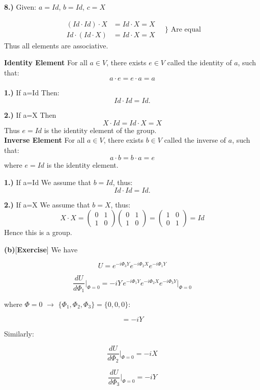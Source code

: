\documentclass{article}
\begin{document}
\textbf{8.)}
Given: \( a = Id \), \( b = Id \), \( c = X \)

\[
\begin{aligned}
(Id \cdot Id) \cdot X &= Id \cdot X = X \\
Id \cdot (Id \cdot X) &= Id \cdot X = X
\end{aligned}
\quad \} \text{ Are equal}
\]
Thus all elements are associative.


\textbf{Identity Element}
For all \( a \in V \), there exists \( e \in V \) called the identity of \( a \), such that:
\[
a \cdot e = e \cdot a = a
\]

\textbf{1.)} If a=Id
Then:
\[
Id \cdot Id = Id.
\]

\textbf{2.)} If a=X
Then 
\[
X \cdot Id =Id \cdot X=X
\]
Thus  \( e=Id \) is the identity element of the group.
\\
\textbf{Inverse Element}
For all \( a \in V \), there exists \( b \in V \) called the inverse of \( a \), such that:
\[
a \cdot b = b \cdot a = e
\]
where \( e=Id\) is the identity element.

\textbf{1.)} If a=Id
We assume that \( b = Id \), thus:
\[
Id \cdot Id = Id.
\]

\textbf{2.)} If a=X
We assume that \( b = X \), thus:
\[
X \cdot X = 
\begin{pmatrix} 
0 & 1 \\
1 & 0 
\end{pmatrix}
\begin{pmatrix} 
0 & 1 \\
1 & 0 
\end{pmatrix}
=
\begin{pmatrix} 
1 & 0 \\
0 & 1 
\end{pmatrix}
= Id
\]
Hence this is a group.


\textbf{(b)}[\textbf{Exercise}]
We have

\[
U = e^{-i \Phi_3 Y} e^{-i \Phi_2 X} e^{-i \Phi_1 Y}
\]

\[
\frac{dU}{d\Phi_1} \Big|_{\Phi=0} = -i Y \, e^{-i \Phi_1 Y} e^{-i \Phi_2 X} e^{-i \Phi_3 Y} \Big|_{\Phi=0}
\]

where \(\Phi = 0\) \(\rightarrow\) \(\{\Phi_1, \Phi_2, \Phi_3\} = \{0, 0, 0\}\):

\[
= -i Y
\]

Similarly:

\[
\frac{dU}{d\Phi_2} \Big|_{\Phi=0} = -i X
\]

\[
\frac{dU}{d\Phi_3} \Big|_{\Phi=0} = -i Y
\]
\end{document}
